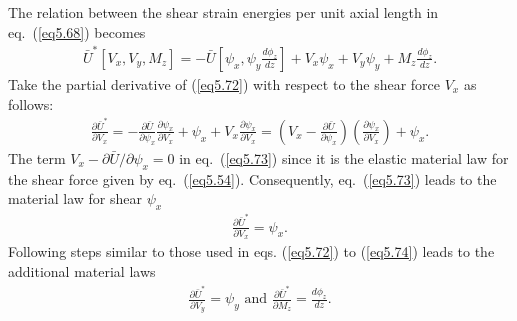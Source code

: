 \documentclass{AeroStructure-ERJohnson}
\begin{document}
The relation between the shear strain energies per unit axial length in eq.~(\ref{eq5.68}) becomes
\begin{align}\label{eq5.72}
\bar{U}^{*}\left[V_{x}, V_{y}, M_{z}\right]=-\bar{U}\left[\psi_{x}, \psi_{y} \frac{d \phi_{z}}{d z}\right]+V_{x} \psi_{x}+V_{y} \psi_{y}+M_{z} \frac{d \phi_{z}}{d z}.
\end{align}
Take the partial derivative of (\ref{eq5.72}) with respect to the shear force $V_x$ as follows:
\begin{align}\label{eq5.73}
\frac{\partial \bar{U}^{*}}{\partial V_{x}}=-\frac{\partial \bar{U}}{\partial \psi_{x}} \frac{\partial \psi_{x}}{\partial V_{x}}+\psi_{x}+V_{x} \frac{\partial \psi_{x}}{\partial V_{x}}=\left(V_{x}-\frac{\partial \bar{U}}{\partial \psi_{x}}\right)\left(\frac{\partial \psi_{x}}{\partial V_{x}}\right)+\psi_{x}.
\end{align}
The term $V_{x}-\partial \bar{U} / \partial \psi_{x}=0$ in eq.~(\ref{eq5.73}) since it is the elastic material law for the shear force given by eq.~(\ref{eq5.54}). Consequently, eq.~(\ref{eq5.73}) leads to the material law for shear $\psi_{x}$
\begin{align}\label{eq5.74}
\frac{\partial \bar{U}^{*}}{\partial V_{x}}=\psi_{x}.
\end{align}
Following steps similar to those used in eqs. (\ref{eq5.72}) to (\ref{eq5.74}) leads to the additional material laws
\begin{align}\label{eq5.75}
\frac{\partial \bar{U}^{*}}{\partial V_{y}}=\psi_{y}\mbox{ and }\frac{\partial \bar{U}^{*}}{\partial M_{z}}=\frac{d \phi_z}{d z}.
\end{align}

\vspace*{-1pc}
\end{document}
